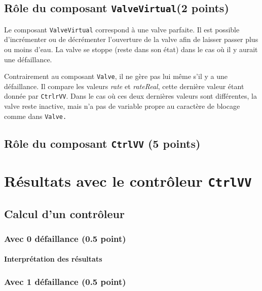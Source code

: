 \documentclass[a4paper]{book}
\begin{document}
\subsection{Rôle du composant {\tt ValveVirtual}(2 points)}
Le composant {\tt ValveVirtual} correspond à une valve parfaite. Il est possible d'incrémenter ou de décrémenter l'ouverture de la valve afin de laisser passer plus ou moins d'eau. La valve se stoppe (reste dans son état) dans le cas où il y aurait une défaillance.

Contrairement au composant {\tt Valve}, il ne gère pas lui même s'il y a une défaillance. Il compare les valeurs \textit{rate} et \textit{rateReal}, cette dernière valeur étant donnée par {\tt CtrlrVV}. Dans le cas où ces deux dernières valeurs sont différentes, la valve reste inactive, mais n'a pas de variable propre au caractère de blocage comme dans \tt{Valve}.

\subsection{Rôle du composant {\tt CtrlVV} (5 points)}

\section{Résultats avec le contrôleur {\tt CtrlVV}}
\subsection{Calcul d'un contrôleur}
\subsubsection{Avec 0 défaillance (0.5 point)}



%
%
\paragraph{Interprétation des résultats}

\subsubsection{Avec 1 défaillance (0.5 point)}





\end{document}
